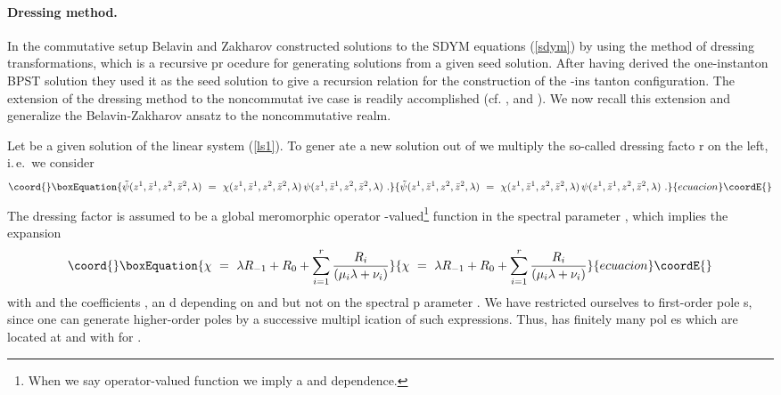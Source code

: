 \documentclass[a4paper,11pt,english]{article}
\numberwithin{equation}{section}
\renewcommand{\=}{\ =\ }
\begin{document}
\paragraph{Dressing method.} 
In the commutative setup Belavin and Zakharov constructed \cite{
Belavin:cz} solutions to the SDYM equations (\ref{sdym}) 
by using the method of dressing transformations, which is a recursive pr%
ocedure for generating solutions from a given seed solution. After having
derived the one-instanton BPST solution they used it as the seed %
solution to give a recursion relation for the construction of the \coordHE{}-ins%
tanton configuration. The extension of the dressing method to the noncommutat%
ive case is readily accomplished (cf. \cite{Lechtenfeld:2001aw}, \cite{
Lechtenfeld:2001gf} and \cite{Wolf:2002jw}). We now recall this extension
and generalize the Belavin-Zakharov ansatz to the noncommutative realm.

Let \myHighlight{$\psi$}\coordHE{} be a given solution of the linear system (\ref{ls1}). To gener%
ate a new solution out of \myHighlight{$\psi$}\coordHE{} we multiply the so-called dressing facto%
r \myHighlight{$\chi$}\coordHE{} on the left, i.\,e.\ we consider
\begin{equation}\coord{}\boxEquation{
 \tilde{\psi}(z^1,\bar{z}^1,z^2,\bar{z}^2,\lambda)\=\chi(z^1,\bar{z}^1,z
^2,\bar{z}^2,\lambda)\,\psi(z^1,\bar{z}^1,z^2,\bar{z}^2,\lambda)\ .
}{
 \tilde{\psi}(z^1,\bar{z}^1,z^2,\bar{z}^2,\lambda)\=\chi(z^1,\bar{z}^1,z
^2,\bar{z}^2,\lambda)\,\psi(z^1,\bar{z}^1,z^2,\bar{z}^2,\lambda)\ .
}{ecuacion}\coordE{}\end{equation}
The dressing factor \myHighlight{$\chi$}\coordHE{} is assumed to be a global meromorphic operator%
-valued\footnote{When we say operator-valued function we imply a \coordHE{} and \coordHE{} dependence.} function in the spectral parameter 
\coordHE{}, which implies the expansion
\begin{equation}\coord{}\boxEquation{\label{ansatzchi}
 \chi \= \lambda R_{-1}+R_0+\sum_{i=1}^r\frac{R_i}{(\mu_i\lambda+\nu_i
)}
}{\chi \= \lambda R_{-1}+R_0+\sum_{i=1}^r\frac{R_i}{(\mu_i\lambda+\nu_i
)}
}{ecuacion}\coordE{}\end{equation}
with \coordHE{} and the coefficients \coordHE{}, \coordHE{} an%
d \coordHE{} depending on \coordHE{} and \coordHE{} but not on the spectral p%
arameter \myHighlight{$\lambda$}\coordHE{}. We have restricted ourselves to first-order pole%
s, since one can generate higher-order poles by a successive multipl%
ication of such expressions. Thus, \myHighlight{$\chi$}\coordHE{} has finitely many pol%
es which are located at \myHighlight{$\lambda_\infty=\infty$}\coordHE{} and \coordHE{} with \coordHE{} for \coordHE{} .
\end{document}
